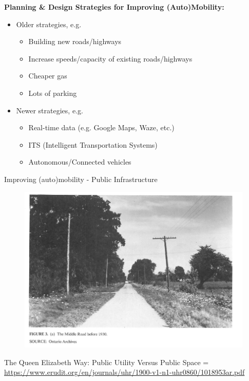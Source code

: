\documentclass[aspectratio=169]{beamer}
\begin{document}
\begin{frame}
	
	
	\vspace{4mm}
	
	\textbf{Planning \& Design Strategies for Improving (Auto)Mobility:}
	
	\vspace{2mm}
	
	\begin{itemize}
		\item Older strategies, e.g.
		\begin{itemize}
			\item Building new roads/highways
			\item Increase speeds/capacity of existing roads/highways
			\item Cheaper gas
			\item Lots of parking
		\end{itemize}
		
		\item Newer strategies, e.g.
		\begin{itemize}
			\item Real-time data (e.g. Google Maps, Waze, etc.)
			\item ITS (Intelligent Transportation Systems)
			\item Autonomous/Connected vehicles
		\end{itemize}
	\end{itemize}
	
\end{frame}








	
	


\begin{frame}
	
	Improving (auto)mobility - Public Infrastructure
	
	\begin{figure}
		\centering
		\includegraphics[width=0.8\linewidth]{images/qew_1930.png}
		
	\end{figure}
	\tiny{The Queen Elizabeth Way: Public Utility Versus Public Space = \url{https://www.erudit.org/en/journals/uhr/1900-v1-n1-uhr0860/1018953ar.pdf}}
	
\end{frame}
\end{document}
